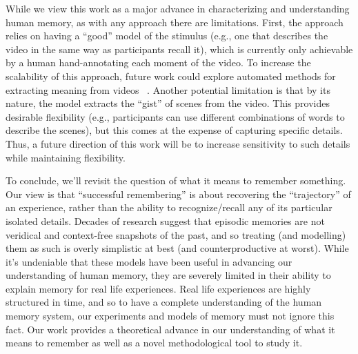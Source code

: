 While we view this work as a major advance in characterizing and understanding human memory, as with any approach there are limitations. First, the approach relies on having a ``good'' model of the stimulus (e.g., one that describes the video in the same way as participants recall it), which is currently only achievable by a human hand-annotating each moment of the video.  To increase the scalability of this approach, future work could explore automated methods for extracting meaning from videos ~\citep{YuEtal16}.  Another potential limitation is that by its nature, the model extracts the ``gist'' of scenes from the video.  This provides desirable flexibility (e.g., participants can use different combinations of words to describe the scenes), but this comes at the expense of capturing specific details.  Thus, a future direction of this work will be to increase sensitivity to such details while maintaining flexibility.

To conclude, we'll revisit the question of what it means to remember something. Our view is that ``successful remembering'' is about recovering the ``trajectory'' of an experience, rather than the ability to recognize/recall any of its particular isolated details. Decades of research suggest that episodic memories are not veridical and context-free snapshots of the past, and so treating (and modelling) them as such is overly simplistic at best (and counterproductive at worst). While it's undeniable that these models have been useful in advancing our understanding of human memory, they are severely limited in their ability to explain memory for real life experiences. Real life experiences are highly structured in time, and so to have a complete understanding of the human memory system, our experiments and models of memory must not ignore this fact. Our work provides a theoretical advance in our understanding of what it means to remember as well as a novel methodological tool to study it.





